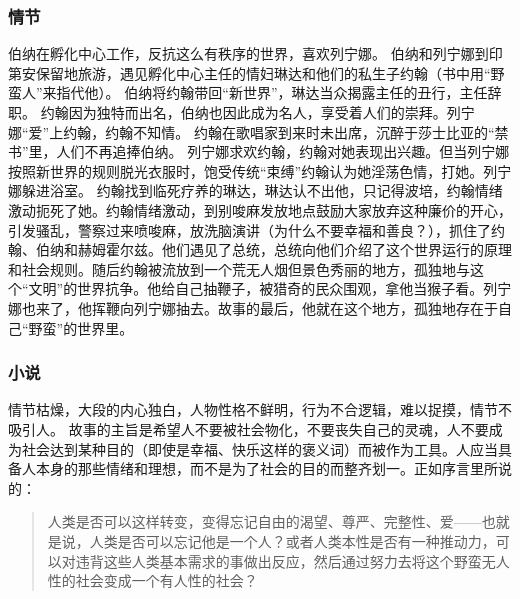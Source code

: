 \subsubsection{情节}
伯纳在孵化中心工作，反抗这么有秩序的世界，喜欢列宁娜。
伯纳和列宁娜到印第安保留地旅游，遇见孵化中心主任的情妇琳达和他们的私生子约翰（书中用“野蛮人”来指代他）。
伯纳将约翰带回“新世界”，琳达当众揭露主任的丑行，主任辞职。
约翰因为独特而出名，伯纳也因此成为名人，享受着人们的崇拜。列宁娜“爱”上约翰，约翰不知情。
约翰在歌唱家到来时未出席，沉醉于莎士比亚的“禁书”里，人们不再追捧伯纳。
列宁娜求欢约翰，约翰对她表现出兴趣。但当列宁娜按照新世界的规则脱光衣服时，饱受传统“束缚”约翰认为她淫荡色情，打她。列宁娜躲进浴室。
约翰找到临死疗养的琳达，琳达认不出他，只记得波培，约翰情绪激动扼死了她。约翰情绪激动，到别唆麻发放地点鼓励大家放弃这种廉价的开心，引发骚乱，警察过来喷唆麻，放洗脑演讲（为什么不要幸福和善良？），抓住了约翰、伯纳和赫姆霍尔兹。他们遇见了总统，总统向他们介绍了这个世界运行的原理和社会规则。随后约翰被流放到一个荒无人烟但景色秀丽的地方，孤独地与这个“文明”的世界抗争。他给自己抽鞭子，被猎奇的民众围观，拿他当猴子看。列宁娜也来了，他挥鞭向列宁娜抽去。故事的最后，他就在这个地方，孤独地存在于自己“野蛮”的世界里。

\subsubsection{小说}
情节枯燥，大段的内心独白，人物性格不鲜明，行为不合逻辑，难以捉摸，情节不吸引人。
故事的主旨是希望人不要被社会物化，不要丧失自己的灵魂，人不要成为社会达到某种目的（即使是幸福、快乐这样的褒义词）而被作为工具。人应当具备人本身的那些情绪和理想，而不是为了社会的目的而整齐划一。正如序言里所说的：
\begin{quotation}
人类是否可以这样转变，变得忘记自由的渴望、尊严、完整性、爱——也就是说，人类是否可以忘记他是一个人？或者人类本性是否有一种推动力，可以对违背这些人类基本需求的事做出反应，然后通过努力去将这个野蛮无人性的社会变成一个有人性的社会？
\end{quotation}
